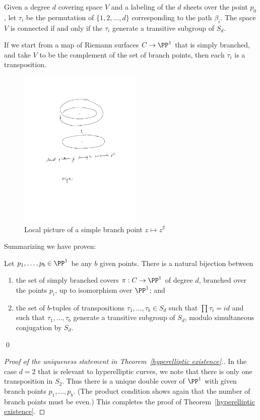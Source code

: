 Given a degree $d$ covering space $V$ and a labeling of the $d$ sheets over the point $p_0$, let $\tau_i$ be the permutation of $\{1,2,\dots,d\}$ corresponding to the path $\beta_i$. The space $V$ is connected if and only if the $\tau_{i}$ generate a transitive subgroup of $S_{d}$.
 
If we start from a map of Riemann surfaces $C\to \PP^{1}$ that is
 simply branched, and take $V$ to be the complement of the set of branch points, 
 then each $\tau_i$ is a transposition. 

\begin{figure}
 \caption{Local picture of a simple branch point $z \mapsto z^2$}
\centerline {\includegraphics[height=3in]{"Fig5.1.pdf"}}
\end{figure}

Summarizing we have proven:   
   \begin{lemma}\label{branched cover classification}
   Let $p_1,\dots, p_b \in \PP^1$ be any $b$ given points. There is a natural bijection between 
   \begin{enumerate}
   \item the set of  simply branched covers $\pi : C \to \PP^1$ of degree $d$, branched over the points $p_i$, up to isomorphism over $\PP^1$; and
   \item the set of $b$-tuples of transpositions $\tau_1, \dots, \tau_b \in S_d$ such that $\prod \tau_i = id$ and such that $\tau_1, \dots, \tau_b$ generate a transitive subgroup of $S_d$, modulo simultaneous conjugation by $S_d$.
   \end{enumerate}\qed
   \end{lemma}
   
\begin{proof}[Proof of the uniqueness statement  in Theorem~\ref{hyperelliptic existence}.]
In the case $d=2$ that is relevant to hyperelliptic curves, we note that there is only one transposition in $S_2$. Thus there is a unique double cover of $\PP^1$ with given branch points $p_1,\dots,p_b$. (The product
condition shows again that the number of branch points must be even.) This completes the proof of Theorem~\ref{hyperelliptic existence}.
\end{proof}

